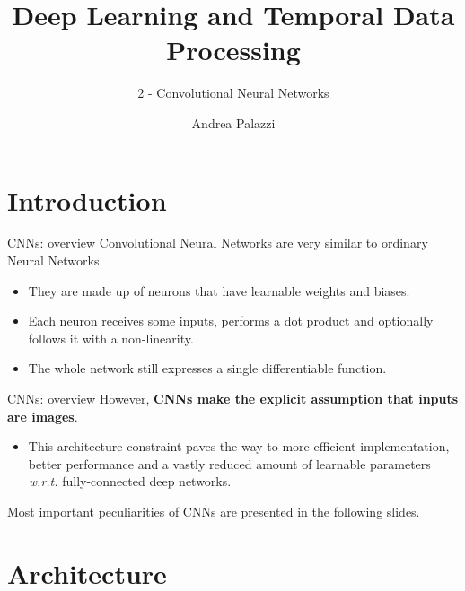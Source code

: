 \documentclass[aspectratio=169]{beamer}
\title[Deep Learning and Temporal Data Processing]{Deep Learning and Temporal Data Processing}
\subtitle{2 - Convolutional Neural Networks}
\institute{University of Modena and Reggio Emilia}
\author{Andrea Palazzi}
\def\thisframelogos{}
\newcommand{\framelogo}[1]{\def\thisframelogos{#1}}
\begin{document}
\framelogo{img/template/logo_unimore_white.png}







\section{Introduction}


\begin{frame}{CNNs: overview}
Convolutional Neural Networks are very similar to ordinary Neural Networks.\\
\begin{itemize}
\item They are made up of neurons that have learnable weights and biases.
\item Each neuron receives some inputs, performs a dot product and optionally follows it with a non-linearity.
\item The whole network still expresses a single differentiable function.
\end{itemize}
\end{frame}


\begin{frame}{CNNs: overview}
However, \textbf{CNNs make the explicit assumption that inputs are images}.
\begin{itemize}
\item \large{This architecture constraint paves the way to more efficient implementation, better performance and a vastly reduced amount of learnable parameters \emph{w.r.t.} fully-connected deep networks.}
\end{itemize}
Most important peculiarities of CNNs are presented in the following slides.
\end{frame}




\section{Architecture}
\end{document}
